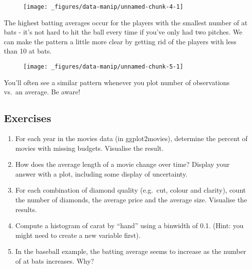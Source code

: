 \begin{figure}[H]
  \centering
  \texttt{[image: \_figures/data-manip/unnamed-chunk-4-1]}
\end{figure}

The highest batting averages occur for the players with the smallest
number of at bats - it's not hard to hit the ball every time if you've
only had two pitches. We can make the pattern a little more clear by
getting rid of the players with less than 10 at bats.

\begin{Shaded}
\begin{Highlighting}[]
\NormalTok{(}\StringTok{ }\NormalTok{), }\StringTok{ }
\StringTok{  }\NormalTok{() +}\StringTok{ }
\StringTok{  }\NormalTok{()}
\end{Highlighting}
\end{Shaded}

\begin{figure}[H]
  \centering
  \texttt{[image: \_figures/data-manip/unnamed-chunk-5-1]}
\end{figure}

You'll often see a similar pattern whenever you plot number of
observations vs.~an average. Be aware!

\subsection{Exercises}

\begin{enumerate}
\def\labelenumi{\arabic{enumi}.}
\item
  For each year in the movies data (in ggplot2movies), determine the
  percent of movies with missing budgets. Visualise the result.
\item
  How does the average length of a movie change over time? Display your
  answer with a plot, including some display of uncertainty.
\item
  For each combination of diamond quality (e.g.~cut, colour and
  clarity), count the number of diamonds, the average price and the
  average size. Visualise the results.
\item
  Compute a histogram of carat by ``hand'' using a binwidth of 0.1.
  (Hint: you might need to create a new variable first).
\item
  In the baseball example, the batting average seems to increase as the
  number of at bats increases. Why?
\end{enumerate}

